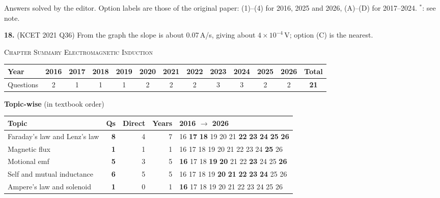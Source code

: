 {\footnotesize Answers solved by the editor. Option labels are those of the original paper: (1)--(4) for 2016, 2025 and 2026, (A)--(D) for 2017--2024. $^{*}$: see note.
\par\smallskip\textbf{18.} (KCET 2021 Q36) From the graph the slope is about 0.07\,A/s, giving about $4\times10^{-4}$\,V; option (C) is the nearest.
}\par
\par{}\vspace{14pt}
\begin{center}{}\par
{\large\color{navy}\scshape Chapter Summary \textperiodcentered{} Electromagnetic Induction}\end{center}
{\small\setlength{\tabcolsep}{3.5pt}
\begin{tabular*}{\linewidth}{@{\extracolsep{\fill}}l*{11}{c}c@{}}\toprule
Year & 2016 & 2017 & 2018 & 2019 & 2020 & 2021 & 2022 & 2023 & 2024 & 2025 & 2026 & Total\\\midrule
Questions & 2 & 1 & 1 & 1 & 2 & 2 & 2 & 3 & 3 & 2 & 2 & \textbf{21}\\\bottomrule\end{tabular*}}\par\medskip
{\small\textbf{\color{crimson}Topic-wise} (in textbook order)\par\smallskip
\begin{tabularx}{\linewidth}{@{}>{\raggedright\arraybackslash}Xrrrl@{}}\toprule
Topic & Qs & Direct & Years & 2016 $\rightarrow$ 2026\\\midrule
Faraday's law and Lenz's law & \textbf{8} & 4 & 7 & {\scriptsize {\color{gray!45}16} \textbf{17} \textbf{18} {\color{gray!45}19} {\color{gray!45}20} {\color{gray!45}21} \textbf{22} \textbf{23} \textbf{24} \textbf{25} \textbf{26}}\\
Magnetic flux & \textbf{1} & 1 & 1 & {\scriptsize {\color{gray!45}16} {\color{gray!45}17} {\color{gray!45}18} {\color{gray!45}19} {\color{gray!45}20} {\color{gray!45}21} {\color{gray!45}22} {\color{gray!45}23} {\color{gray!45}24} \textbf{25} {\color{gray!45}26}}\\
Motional emf & \textbf{5} & 3 & 5 & {\scriptsize \textbf{16} {\color{gray!45}17} {\color{gray!45}18} \textbf{19} \textbf{20} {\color{gray!45}21} {\color{gray!45}22} \textbf{23} {\color{gray!45}24} {\color{gray!45}25} \textbf{26}}\\
Self and mutual inductance & \textbf{6} & 5 & 5 & {\scriptsize {\color{gray!45}16} {\color{gray!45}17} {\color{gray!45}18} {\color{gray!45}19} \textbf{20} \textbf{21} \textbf{22} \textbf{23} \textbf{24} {\color{gray!45}25} {\color{gray!45}26}}\\
Ampere's law and solenoid & \textbf{1} & 0 & 1 & {\scriptsize \textbf{16} {\color{gray!45}17} {\color{gray!45}18} {\color{gray!45}19} {\color{gray!45}20} {\color{gray!45}21} {\color{gray!45}22} {\color{gray!45}23} {\color{gray!45}24} {\color{gray!45}25} {\color{gray!45}26}}\\
\bottomrule\end{tabularx}}\par\medskip
